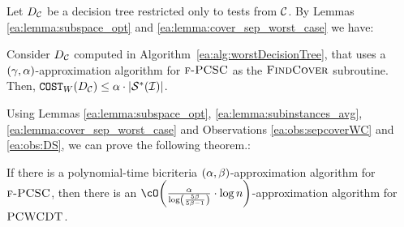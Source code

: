 


Let $D_{\mathcal{C}}$ be a decision tree restricted only to tests from $\mathcal{C}$. By Lemmas \ref{ea:lemma:subspace_opt} and \ref{ea:lemma:cover_sep_worst_case} we have:
    \begin{observation} \label{ea:obs:DS}
        Consider $D_{\mathcal{C}}$ computed in Algorithm~\ref{ea:alg:worstDecisionTree}, that uses a $\mathopen{}\left( \gamma,\alpha \right)$-approximation algorithm for $\textup{\textsc{f-PCSC}}$ as the $\textup{\textsc{FindCover}}{}$ subroutine.
        Then, $\texttt{COST}_W\mathopen{}\left( D_{\mathcal{C}} \right) \leq \alpha \cdot \mathopen{}\left| \mathcal{S}^*\mathopen{}\left( \mathcal{I} \right) \right|$.
    \end{observation}

Using Lemmas \ref{ea:lemma:subspace_opt}, \ref{ea:lemma:subinstances_avg}, \ref{ea:lemma:cover_sep_worst_case} and Observations \ref{ea:obs:sepcoverWC} and \ref{ea:obs:DS}, we can prove the following theorem.:
\begin{theorem} \label{ea:thm:PCSC-to-PCWCDT}
If there is a polynomial-time bicriteria $\mathopen{}\left( \alpha, \beta \right)$-approximation algorithm for $\textup{\textsc{f-PCSC}}$, then there is an
$\cO\br{\frac{\alpha}{\log\br{\frac{5\beta}{5\beta -1}}} \cdot \log n}$-approximation algorithm for $\textup{\textsc{PCWCDT}}$. 
\end{theorem}

